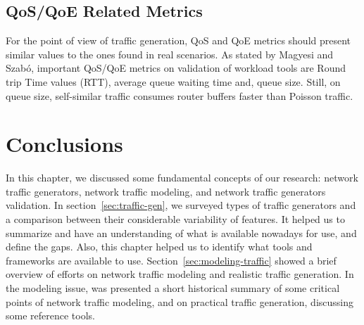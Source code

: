 \subsection{QoS/QoE Related Metrics}


For the point of view of traffic generation, QoS and QoE metrics should present similar values to the ones found in real scenarios. As stated by Magyesi and Szabó\cite{validate-trafficgen}, important QoS/QoE metrics on validation of workload tools are Round trip Time values (\acrshort{RTT}), average queue waiting time and, queue size. Still, on queue size, self-similar traffic consumes router buffers faster than Poisson traffic\cite{multi-player-online-game-self-similarity}.

\section{Conclusions}


In this chapter, we discussed some fundamental concepts of our research: network traffic generators, network traffic modeling, and network traffic generators validation. In section~\ref{sec:traffic-gen}, we surveyed types of traffic generators and a comparison between their considerable variability of features. It helped us to summarize and have an understanding of what is available nowadays for use, and define the gaps. Also, this chapter helped us to identify what tools and frameworks are available to use. Section~\ref{sec:modeling-traffic} showed a brief overview of efforts on network traffic modeling and realistic traffic generation. In the modeling issue, was presented a short historical summary of some critical points of network traffic modeling, and on practical traffic generation, discussing some reference tools.



